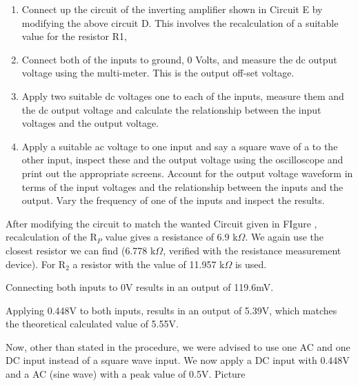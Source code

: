\begin{enumerate}
	\item Connect up the circuit of the inverting amplifier shown in Circuit E by modifying the above
circuit D. This involves the recalculation of a suitable value for the resistor R1,

	\item Connect both of the inputs to ground, 0 Volts, and measure the dc output voltage using the
multi-meter. This is the output off-set voltage.


	\item Apply two suitable dc voltages one to each of the inputs, measure them and the dc output
voltage and calculate the relationship between the input voltages and the output voltage.


	\item Apply a suitable ac voltage to one input and say a square wave of a to the other input,
inspect these and the output voltage using the oscilloscope and print out the appropriate
screens. Account for the output voltage waveform in terms of the input voltages and the
relationship between the inputs and the output. Vary the frequency of one of the inputs and
inspect the results.

\end{enumerate}
%
%

After modifying the circuit to match the wanted Circuit given in FIgure , recalculation of the R$_P$ value gives a resistance of 6.9 k$\Omega$. We again use the closest resistor we can find (6.778 k$\Omega$, verified with the resistance measurement device).
For R$_2$ a resistor with the value of 11.957 k$\Omega$ is used.

Connecting both inputs to 0V results in an output of 119.6mV.

Applying 0.448V to both inputs, results in an output of 5.39V, which matches the theoretical calculated value of 5.55V. 

Now, other than stated in the procedure, we were advised to use one AC and one DC input instead of a square wave input.
We now apply a DC input with 0.448V and a AC (sine wave) with a peak value of 0.5V.
Picture 




